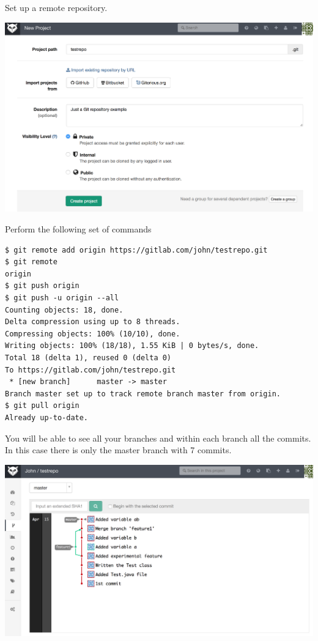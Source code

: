 \documentclass{article}
\begin{document}
Set up a remote repository.

\begin{center}
\includegraphics[scale=0.4]{figures/s1-b.png}
\end{center}

Perform the following set of commands
\begin{lstlisting}
$ git remote add origin https://gitlab.com/john/testrepo.git
$ git remote
origin
$ git push origin
$ git push -u origin --all
Counting objects: 18, done.
Delta compression using up to 8 threads.
Compressing objects: 100% (10/10), done.
Writing objects: 100% (18/18), 1.55 KiB | 0 bytes/s, done.
Total 18 (delta 1), reused 0 (delta 0)
To https://gitlab.com/john/testrepo.git
 * [new branch]      master -> master
Branch master set up to track remote branch master from origin.
$ git pull origin
Already up-to-date.
\end{lstlisting}

You will be able to see all your branches and within each branch all
the commits. In this case there is only the master branch with 7 commits.
\begin{center}
\includegraphics[scale=0.4]{figures/s2-b.png}
\end{center}
\end{document}
